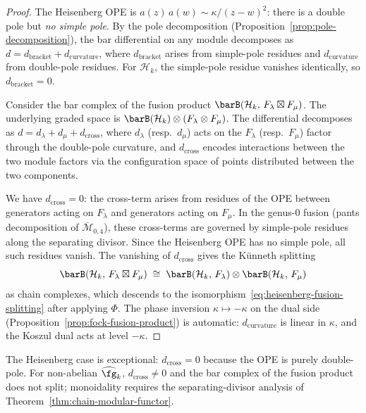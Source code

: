 \begin{proof}
The Heisenberg OPE is $a(z)\,a(w) \sim \kappa/(z-w)^2$: there
is a double pole but \emph{no simple pole}. By the pole
decomposition
(Proposition~\ref{prop:pole-decomposition}), the bar
differential on any module decomposes as
$d = d_{\mathrm{bracket}} + d_{\mathrm{curvature}}$, where
$d_{\mathrm{bracket}}$ arises from simple-pole residues and
$d_{\mathrm{curvature}}$ from double-pole residues. For
$\mathcal{H}_k$, the simple-pole residue vanishes
identically, so $d_{\mathrm{bracket}} = 0$.

Consider the bar complex of the fusion product
$\barB(\mathcal{H}_k,\, F_\lambda \boxtimes F_\mu)$.
The underlying graded space is
$\barB(\mathcal{H}_k) \otimes (F_\lambda \otimes F_\mu)$.
The differential decomposes as
$d = d_\lambda + d_\mu + d_{\mathrm{cross}}$,
where $d_\lambda$ (resp.\ $d_\mu$) acts on the
$F_\lambda$ (resp.\ $F_\mu$) factor through the double-pole
curvature, and $d_{\mathrm{cross}}$ encodes interactions between
the two module factors via the configuration space of points
distributed between the two components.

We have $d_{\mathrm{cross}} = 0$:
the cross-term arises from residues of the OPE between
generators acting on $F_\lambda$ and generators acting on
$F_\mu$. In the genus-$0$ fusion (pants decomposition of
$\overline{\mathcal{M}}_{0,4}$), these cross-terms are governed
by simple-pole residues along the separating divisor. Since
the Heisenberg OPE has no simple pole, all such residues
vanish. The vanishing of $d_{\mathrm{cross}}$ gives the
K\"unneth splitting
\[
\barB(\mathcal{H}_k,\, F_\lambda \boxtimes F_\mu)
\;\cong\;
\barB(\mathcal{H}_k,\, F_\lambda)
\otimes
\barB(\mathcal{H}_k,\, F_\mu)
\]
as chain complexes, which descends to the
isomorphism~\eqref{eq:heisenberg-fusion-splitting} after
applying $\Phi$. The phase inversion
$\kappa \mapsto -\kappa$ on the dual side
(Proposition~\ref{prop:fock-fusion-product}) is automatic:
$d_{\mathrm{curvature}}$ is linear in $\kappa$, and the
Koszul dual acts at level $-\kappa$.
\end{proof}

\begin{remark}\label{rem:heisenberg-fusion-simplicity}
The Heisenberg case is exceptional: $d_{\mathrm{cross}} = 0$ because the OPE is purely double-pole. For non-abelian $\widehat{\fg}_k$, $d_{\mathrm{cross}} \neq 0$ and the bar complex of the fusion product does not split; monoidality requires the separating-divisor analysis of Theorem~\ref{thm:chain-modular-functor}.
\end{remark}

